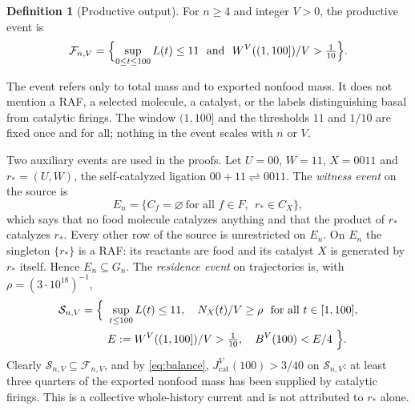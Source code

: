 \documentclass[11pt,letterpaper]{article}
\theoremstyle{plain}
\theoremstyle{definition}
\newtheorem{definition}[theorem]{Definition}
\theoremstyle{remark}
\numberwithin{equation}{section}
\newcommand{\cF}{\mathcal F}
\newcommand{\cS}{\mathcal S}
\newcommand{\cat}{\mathrm{cat}}
\begin{document}
\begin{definition}[Productive output]\label{def:output}
For $n\ge4$ and integer $V>0$, the productive event is
\begin{equation}\label{eq:F}
 \cF_{n,V}=\Bigl\{\sup_{0\le t\le100}L(t)\le11\ \text{ and }\ W^V((1,100])/V>\tfrac1{10}\Bigr\}.
\end{equation}
\end{definition}
The event refers only to total mass and to exported nonfood mass. It does not mention a RAF, a selected molecule, a catalyst, or the labels distinguishing basal from catalytic firings. The window $(1,100]$ and the thresholds $11$ and $1/10$ are fixed once and for all; nothing in the event scales with $n$ or $V$.

Two auxiliary events are used in the proofs. Let $U=00$, $W=11$, $X=0011$ and $r_*=(U,W)$, the self-catalyzed ligation $00+11\rightleftharpoons0011$. The \emph{witness event} on the source is
\begin{equation}\label{eq:E}
 E_n=\{C_f=\varnothing\ \text{for all }f\in F,\ \ r_*\in C_X\},
\end{equation}
which says that no food molecule catalyzes anything and that the product of $r_*$ catalyzes $r_*$. Every other row of the source is unrestricted on $E_n$. On $E_n$ the singleton $\{r_*\}$ is a RAF: its reactants are food and its catalyst $X$ is generated by $r_*$ itself. Hence $E_n\subseteq G_n$. The \emph{residence event} on trajectories is, with $\rho=(3\cdot10^{18})^{-1}$,
\begin{equation}\label{eq:S}
 \begin{aligned}
 \cS_{n,V}=\Bigl\{\ &\sup_{t\le100}L(t)\le11,\quad N_X(t)/V\ge\rho\ \text{ for all }t\in[1,100],\\
 &E:=W^V((1,100])/V>\tfrac1{10},\quad B^V(100)<E/4\ \Bigr\}.
\end{aligned}
\end{equation}
Clearly $\cS_{n,V}\subseteq\cF_{n,V}$, and by \eqref{eq:balance}, $J^V_\cat(100)>3/40$ on $\cS_{n,V}$: at least three quarters of the exported nonfood mass has been supplied by catalytic firings. This is a collective whole-history current and is not attributed to $r_*$ alone.
\end{document}
